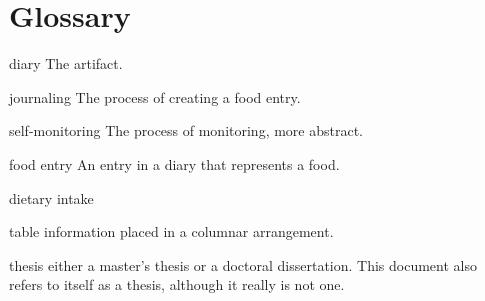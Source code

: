 
\chapter*{Glossary}      %
\thispagestyle{plain}
%
\begin{glossary}
\item[diary] The artifact. 
\item[journaling] The process of creating a food entry. 
\item[self-monitoring] The process of monitoring, more abstract. 
\item[food entry] An entry in a diary that represents a food. 
\item[dietary intake]

\item[table] information placed in a columnar arrangement.
\item[thesis] either a master's thesis or a doctoral dissertation.
This document also refers to itself as a thesis, although it
really is not one.
 
\end{glossary}
